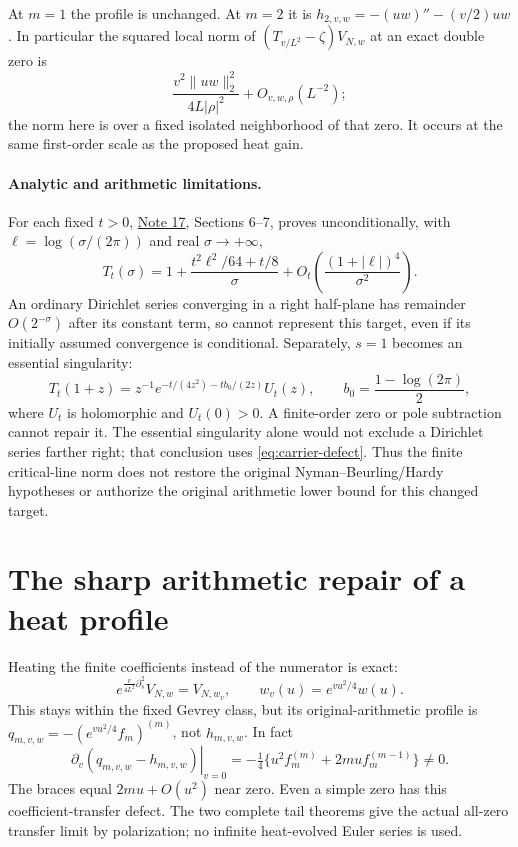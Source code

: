 \documentclass[11pt]{article}
\newcommand{\CNref}{\href{../notes/17_NORMALIZED_HEAT_GLOBAL_LIMIT_AND_ARITHMETIC_COSTS_20261020.md}{Note 17}}
\begin{document}
At \(m=1\) the profile is unchanged. At \(m=2\) it is
\(h_{2,v,w}=-(uw)''-(v/2)uw\). In particular the squared local norm
of \((T_{v/L^2}-\zeta)V_{N,w}\) at an exact double zero is
\[
 \frac{v^2\|uw\|_2^2}{4L|\rho|^2}+O_{v,w,\rho}(L^{-2});
\]
the norm here is over a fixed isolated neighborhood of that zero.
It occurs at the same first-order scale as the proposed heat gain.

\paragraph{Analytic and arithmetic limitations.}
For each fixed \(t>0\), \CNref, Sections 6--7, proves unconditionally,
with \(\ell=\log(\sigma/(2\pi))\) and real \(\sigma\to+\infty\),
\begin{equation}\label{eq:carrier-defect}
 T_t(\sigma)=1+\frac{t^2\ell^2/64+t/8}{\sigma}
             +O_t\!\left(\frac{(1+|\ell|)^4}{\sigma^2}\right).
\end{equation}
An ordinary Dirichlet series converging in a right half-plane has
remainder \(O(2^{-\sigma})\) after its constant term, so cannot
represent this target, even if its initially assumed convergence is
conditional. Separately, \(s=1\) becomes an essential singularity:
\[
 T_t(1+z)=z^{-1}e^{-t/(4z^2)-tb_0/(2z)}U_t(z),\qquad
 b_0=\frac{1-\log(2\pi)}2,
\]
where \(U_t\) is holomorphic and \(U_t(0)>0\). A finite-order zero
or pole subtraction cannot repair it. The essential singularity alone
would not exclude a Dirichlet series farther right; that conclusion
uses \eqref{eq:carrier-defect}. Thus the finite critical-line norm does
not restore the original Nyman--Beurling/Hardy hypotheses or authorize
the original arithmetic lower bound for this changed target.

\section{The sharp arithmetic repair of a heat profile}\label{sec:repair}
Heating the finite coefficients instead of the numerator is exact:
\begin{equation}\label{eq:coefficient-heat}
 e^{\frac{v}{4L^2}\partial_s^2}V_{N,w}=V_{N,w_v},\qquad
 w_v(u)=e^{vu^2/4}w(u).
\end{equation}
This stays within the fixed Gevrey class, but its original-arithmetic
profile is \(q_{m,v,w}=-(e^{vu^2/4}f_m)^{(m)}\), not
\(h_{m,v,w}\). In fact
\[
 \left.\partial_v(q_{m,v,w}-h_{m,v,w})\right|_{v=0}
 =-\tfrac14\{u^2f_m^{(m)}+2mu f_m^{(m-1)}\}\ne0.
\]
The braces equal \(2mu+O(u^2)\) near zero. Even a simple zero has
this coefficient-transfer defect. The two complete tail theorems give
the actual all-zero transfer limit by polarization; no infinite
heat-evolved Euler series is used.
\end{document}
